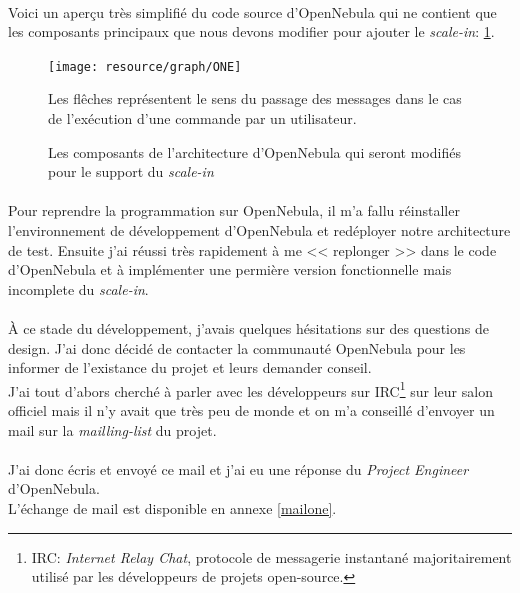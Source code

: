 \paragraph*{}
Voici un aperçu très simplifié du code source d'OpenNebula qui ne contient que les composants principaux que nous devons modifier pour ajouter le \emph{scale-in}: \ref{archionescalein}.

\begin{figure}[H]
\centering
\texttt{[image: resource/graph/ONE]}
\caption{Les composants de l'architecture d'OpenNebula qui seront modifiés pour le support du \emph{scale-in}\\}
Les flêches représentent le sens du passage des messages dans le cas de l'exécution d'une commande par un utilisateur.
\label{archionescalein}
\end{figure}


\paragraph*{}
Pour reprendre la programmation sur OpenNebula, il m'a fallu réinstaller l'environnement de développement d'OpenNebula et redéployer notre architecture de test.
Ensuite j'ai réussi très rapidement à me << replonger >> dans le code d'OpenNebula et à implémenter une permière version fonctionnelle mais incomplete du \emph{scale-in}.

\paragraph*{}
À ce stade du développement, j'avais quelques hésitations sur des questions de design. J'ai donc décidé de contacter la communauté OpenNebula pour les informer de l'existance
du projet et leurs demander conseil.\\
J'ai tout d'abors cherché à parler avec les développeurs sur IRC\footnote{IRC: \emph{Internet Relay Chat}, protocole de messagerie instantané majoritairement utilisé
par les développeurs de projets open-source.} sur leur salon officiel mais il n'y avait que très peu de monde et on m'a conseillé d'envoyer un mail sur la \emph{mailling-list} du
projet.

\paragraph*{}
J'ai donc écris et envoyé ce mail et j'ai eu une réponse du \emph{Project Engineer} d'OpenNebula.\\
L'échange de mail est disponible en annexe \ref{mailone}.


